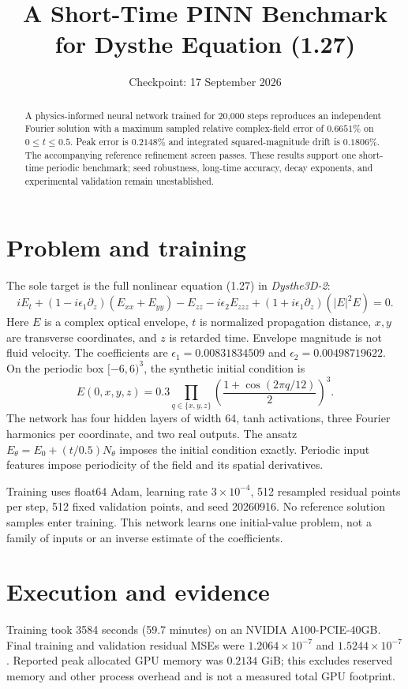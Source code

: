 \documentclass[11pt]{article}
\title{A Short-Time PINN Benchmark for Dysthe Equation (1.27)}
\author{}\date{Checkpoint: 17 September 2026}
\begin{document}
\maketitle
\begin{abstract}
A physics-informed neural network trained for 20,000 steps reproduces an independent Fourier solution with a maximum sampled relative complex-field error of $0.6651\%$ on $0\le t\le0.5$. Peak error is $0.2148\%$ and integrated squared-magnitude drift is $0.1806\%$. The accompanying reference refinement screen passes. These results support one short-time periodic benchmark; seed robustness, long-time accuracy, decay exponents, and experimental validation remain unestablished.
\end{abstract}
\section{Problem and training}
The sole target is the full nonlinear equation (1.27) in \textit{Dysthe3D-2}:
\begin{equation}
iE_t+(1-i\epsilon_1\partial_z)(E_{xx}+E_{yy})-E_{zz}
-i\epsilon_2E_{zzz}+(1+i\epsilon_1\partial_z)(|E|^2E)=0.
\end{equation}
Here $E$ is a complex optical envelope, $t$ is normalized propagation distance, $x,y$ are transverse coordinates, and $z$ is retarded time. Envelope magnitude is not fluid velocity. The coefficients are $\epsilon_1=0.00831834509$ and $\epsilon_2=0.00498719622$.
On the periodic box $[-6,6)^3$, the synthetic initial condition is
\[
E(0,x,y,z)=0.3\prod_{q\in\{x,y,z\}}\left(\frac{1+\cos(2\pi q/12)}{2}\right)^3.
\]
The network has four hidden layers of width 64, tanh activations, three Fourier harmonics per coordinate, and two real outputs. The ansatz $E_\theta=E_0+(t/0.5)N_\theta$ imposes the initial condition exactly. Periodic input features impose periodicity of the field and its spatial derivatives.

Training uses float64 Adam, learning rate $3\times10^{-4}$, 512 resampled residual points per step, 512 fixed validation points, and seed 20260916. No reference solution samples enter training. This network learns one initial-value problem, not a family of inputs or an inverse estimate of the coefficients.
\section{Execution and evidence}
Training took 3584 seconds (59.7 minutes) on an NVIDIA A100-PCIE-40GB. Final training and validation residual MSEs were $1.2064\times10^{-7}$ and $1.5244\times10^{-7}$. Reported peak allocated GPU memory was $0.2134$ GiB; this excludes reserved memory and other process overhead and is not a measured total GPU footprint.
\end{document}
